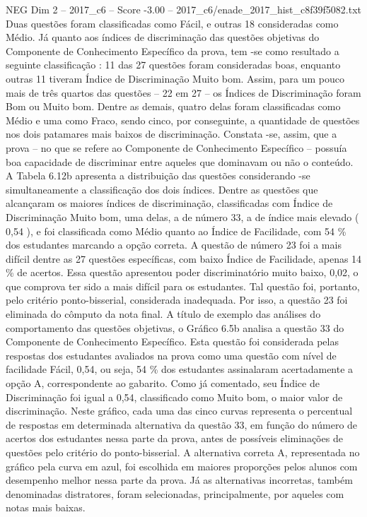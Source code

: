 \begin{textsample}{NEG Dim 2 – 2017\_c6 – Score -3.00 – 2017\_c6/enade\_2017\_hist\_c8f39f5082.txt}
Duas questões foram classificadas como Fácil, e outras 18 consideradas como Médio.
Já quanto aos índices de discriminação das questões objetivas do Componente de Conhecimento Específico da prova, tem -se como resultado a seguinte classificação : 11 das 27 questões foram consideradas boas, enquanto outras 11 tiveram Índice de Discriminação Muito bom.
Assim, para um pouco mais de três quartos das questões – 22 em 27 – os Índices de Discriminação foram Bom ou Muito bom.
Dentre as demais, quatro delas foram classificadas como Médio e uma como Fraco, sendo cinco, por conseguinte, a quantidade de questões nos dois patamares mais baixos de discriminação.
Constata -se, assim, que a prova – no que se refere ao Componente de Conhecimento Específico – possuía boa capacidade de discriminar entre aqueles que dominavam ou não o conteúdo.
A Tabela 6.12b apresenta a distribuição das questões considerando -se simultaneamente a classificação dos dois índices.
Dentre as questões que alcançaram os maiores índices de discriminação, classificadas com Índice de Discriminação Muito bom, uma delas, a de número 33, a de índice mais elevado ( 0,54 ), e foi classificada como Médio quanto ao Índice de Facilidade, com 54 \% dos estudantes marcando a opção correta.
A questão de número 23 foi a mais difícil dentre as 27 questões específicas, com baixo Índice de Facilidade, apenas 14 \% de acertos.
Essa questão apresentou poder discriminatório muito baixo, 0,02, o que comprova ter sido a mais difícil para os estudantes.
Tal questão foi, portanto, pelo critério ponto-bisserial, considerada inadequada.
Por isso, a questão 23 foi eliminada do cômputo da nota final.
A título de exemplo das análises do comportamento das questões objetivas, o Gráfico 6.5b analisa a questão 33 do Componente de Conhecimento Específico.
Esta questão foi considerada pelas respostas dos estudantes avaliados na prova como uma questão com nível de facilidade Fácil, 0,54, ou seja, 54 \% dos estudantes assinalaram acertadamente a opção A, correspondente ao gabarito.
Como já comentado, seu Índice de Discriminação foi igual a 0,54, classificado como Muito bom, o maior valor de discriminação.
Neste gráfico, cada uma das cinco curvas representa o percentual de respostas em determinada alternativa da questão 33, em função do número de acertos dos estudantes nessa parte da prova, antes de possíveis eliminações de questões pelo critério do ponto-bisserial.
A alternativa correta A, representada no gráfico pela curva em azul, foi escolhida em maiores proporções pelos alunos com desempenho melhor nessa parte da prova.
Já as alternativas incorretas, também denominadas distratores, foram selecionadas, principalmente, por aqueles com notas mais baixas.

\end{textsample}
